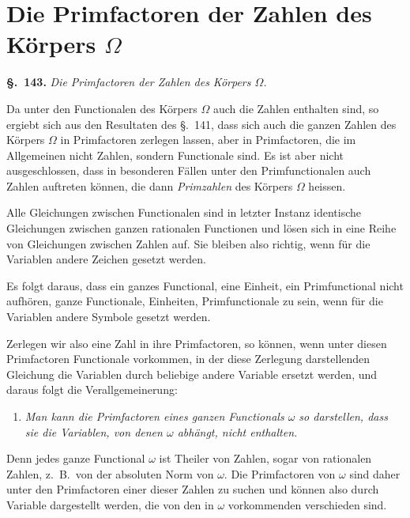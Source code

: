 \documentclass[12pt,a4paper]{article}
\theoremstyle{definition}
\begin{document}
\newpage
\section{Die Primfactoren der Zahlen des Körpers $\Omega$}\label{sec:143}

\noindent\textbf{\S.~143.}\quad
\textit{Die Primfactoren der Zahlen des Körpers $\Omega$.}\par\medskip

Da unter den Functionalen des Körpers $\Omega$ auch die Zahlen enthalten sind, so ergiebt sich aus den Resultaten des \S.~141, dass sich auch die ganzen Zahlen des Körpers $\Omega$ in Primfactoren zerlegen lassen, aber in Primfactoren, die im Allgemeinen nicht Zahlen, sondern Functionale sind. Es ist aber nicht ausgeschlossen, dass in besonderen Fällen unter den Primfunctionalen auch Zahlen auftreten können, die dann \emph{Primzahlen} des Körpers $\Omega$ heissen.

Alle Gleichungen zwischen Functionalen sind in letzter Instanz identische Gleichungen zwischen ganzen rationalen Functionen und lösen sich in eine Reihe von Gleichungen zwischen Zahlen auf. Sie bleiben also richtig, wenn für die Variablen andere Zeichen gesetzt werden.

Es folgt daraus, dass ein ganzes Functional, eine Einheit, ein Primfunctional nicht aufhören, ganze Functionale, Einheiten, Primfunctionale zu sein, wenn für die Variablen andere Symbole gesetzt werden.

Zerlegen wir also eine Zahl in ihre Primfactoren, so können, wenn unter diesen Primfactoren Functionale vorkommen, in der diese Zerlegung darstellenden Gleichung die Variablen durch beliebige andere Variable ersetzt werden, und daraus folgt die Verallgemeinerung:

\begin{enumerate}[label=\arabic*.]
\item \textit{Man kann die Primfactoren eines ganzen Functionals $\omega$ so darstellen, dass sie die Variablen, von denen $\omega$ abhängt, nicht enthalten.}
\end{enumerate}

Denn jedes ganze Functional $\omega$ ist Theiler von Zahlen, sogar von rationalen Zahlen, z.~B.\ von der absoluten Norm von $\omega$. Die Primfactoren von $\omega$ sind daher unter den Primfactoren einer dieser Zahlen zu suchen und können also durch Variable dargestellt werden, die von den in $\omega$ vorkommenden verschieden sind.
\end{document}
